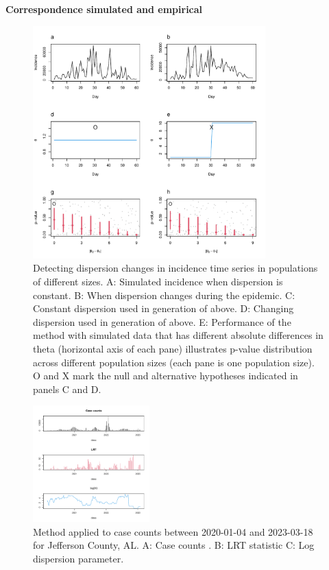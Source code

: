 \documentclass{beamer}
\begin{document}
\begin{frame}{\textbf{Correspondence simulated and empirical}}
		\begin{figure}[!h]
			\includegraphics[width=0.8\textwidth]{fig1}
			\caption{
				Detecting dispersion changes in incidence time series in populations of different sizes. A: Simulated incidence when dispersion is constant. B: When dispersion changes during the epidemic. C: Constant dispersion used in generation of above. D: Changing dispersion used in generation of above. E:  Performance of the method with simulated data that has different absolute differences in theta (horizontal axis of each pane) illustrates p-value distribution across different population sizes (each pane is one population size). O and X mark the null and alternative hypotheses indicated in panels C and D. 
			}
			\label{fig1}
		\end{figure}
\end{frame}

\begin{frame}{\textbf{}}
		\begin{figure}[!h]
			\includegraphics[width=0.4\textwidth]{compare}
			\caption{
				Method applied to case counts between 2020-01-04 and 2023-03-18 for Jefferson County, AL. A: Case counts . B: LRT statistic C: Log dispersion parameter.
			}
			\label{fig2}
		\end{figure}
\end{frame}
\end{document}
